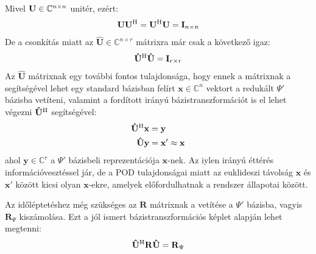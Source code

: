             \par
            Mivel ${\bf U} \in \mathbb{C}^{n \times n}$ unitér, ezért:
            \begin{equation}
                \begin{aligned}
                    \mathbf{U}\mathbf{U}^{\mathrm{H}} = \mathbf{U}^{\mathrm{H}}\mathbf{U} = \mathbf{I}_{n\times n}
                \end{aligned}
            \end{equation}
            De a csonkítás miatt az $\mathbf{\hat{U}} \in \mathbb{C}^{n \times r}$ mátrixra már csak a következő igaz:
            \begin{equation}
                \begin{aligned}
                    \mathbf{\hat{U}}^{\mathrm{H}}\mathbf{\hat{U}} = \mathbf{I}_{r\times r}
                \end{aligned}
            \end{equation}
            Az $\mathbf{\hat{U}}$ mátrixnak egy további fontos tulajdonsága, hogy ennek a mátrixnak a segítségével lehet egy standard bázisban felírt $\mathbf{x} \in \mathbb{C}^{n}$ vektort a redukált $\Psi'$ bázisba vetíteni, valamint a fordított irányú bázistranszformációt is el lehet végezni $\mathbf{\hat{U}}^{\mathrm{H}}$ segítségével:
            \begin{equation}
                \begin{aligned}
                    \mathbf{\hat{U}}^{\mathrm{H}}\mathbf{x} &= \mathbf{y}\\
                    \mathbf{\hat{U}}\mathbf{y} &= \mathbf{x'} \approx \mathbf{x}
                \end{aligned}
            \end{equation}
            ahol $\mathbf{y} \in \mathbb{C}^{r}$ a $\Psi'$ bázisbeli reprezentációja $\mathbf{x}$-nek. Az iylen irányú éttérés információvesztéssel jár, de a POD tulajdonságai miatt az euklideszi távolság $\mathbf{x}$ és $\mathbf{x'}$ között kicsi olyan $\mathbf{x}$-ekre, amelyek előfordulhatnak a rendszer állapotai között.
            \par
            Az időléptetéshez még szükséges az $\mathbf{R}$ mátrixnak a vetítése a $\Psi'$ bázisba, vagyis $\mathbf{R}_{\Psi}$ kiszámolása. Ezt a jól ismert bázistranszformációs képlet alapján lehet megtenni:
            \begin{equation}
                \mathbf{\hat{U}}^{\mathrm{H}}\mathbf{R}\mathbf{\hat{U}} = \mathbf{R}_{\Psi}
            \end{equation}
